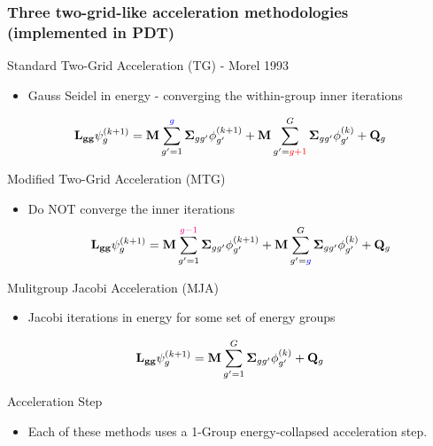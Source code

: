 \documentclass[compress,10pt]{beamer}
\newcommand{\tcr}[1]{\textcolor{red}{#1}}
\newcommand{\tcb}[1]{\textcolor{blue}{#1}}
\newcommand{\tcm}[1]{\textcolor{magenta}{#1}}
\begin{document}
\begin{frame}[t]\frametitle{Three two-grid-like acceleration methodologies (implemented in PDT)}{\footnotesize
\vspace{-2.5mm}
\begin{block}{Standard Two-Grid Acceleration (TG) - Morel 1993}
\begin{itemize}
\item Gauss Seidel in energy - converging the within-group inner iterations
\end{itemize}
\begin{equation*}
{\bf L_{gg}} \psi_g^{(k+1)} = {\bf M} \sum_{g'=1}^{\tcb{g}} {\bf \Sigma}_{g g'} \phi_{g'}^{(k+1)} + {\bf M} \sum_{g'=\tcr{g+1}}^G {\bf \Sigma}_{g g'} \phi_{g'}^{(k)} + {\bf Q}_g
\end{equation*}
\end{block}
\vspace{-2.5mm}
\begin{block}{Modified Two-Grid Acceleration (MTG)}
\begin{itemize}
\item Do NOT converge the inner iterations
\begin{equation*}
{\bf L_{gg}} \psi_g^{(k+1)} = {\bf M} \sum_{g'=1}^{\tcm{g-1}} {\bf \Sigma}_{g g'} \phi_{g'}^{(k+1)} + {\bf M} \sum_{g'=\tcb{g}}^G {\bf \Sigma}_{g g'} \phi_{g'}^{(k)} + {\bf Q}_g
\end{equation*}
\end{itemize}
\end{block}
\vspace{-2.5mm}
\begin{block}{Mulitgroup Jacobi Acceleration (MJA)}
\begin{itemize}
\item Jacobi iterations in energy for some set of energy groups
\end{itemize}
\begin{equation*}
{\bf L_{gg}} \psi_g^{(k+1)} = {\bf M} \sum_{g'=1}^G {\bf \Sigma}_{g g'} \phi_{g'}^{(k)} + {\bf Q}_g
\end{equation*}
\end{block}
\vspace{-2.5mm}
\begin{block}{Acceleration Step}
\begin{itemize}
\item Each of these methods uses a 1-Group energy-collapsed acceleration step.
\end{itemize}
\end{block}
}
\end{frame}
\end{document}
